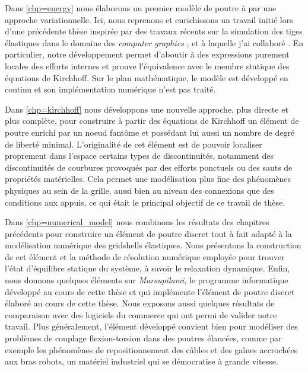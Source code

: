 Dans \cref{chp=energy} nous élaborons un premier modèle de poutre à  par une approche variationnelle. Ici, nous reprenons et enrichissons un travail initié lors d'une précédente thèse \cite{Tayeb2015} inspirée par des travaux récents sur la simulation des tiges élastiques dans le domaine des \emph{computer graphics} \cite{Bergou2008}, et à laquelle j'ai collaboré \cite{DuPeloux2015,Lefevre2017}. En particulier, notre développement permet d'aboutir à des expressions purement locales des efforts internes et prouve l'équivalence avec le membre statique des équations de Kirchhoff. Sur le plan mathématique, le modèle est développé en continu et son implémentation numérique n'est pas traité.

Dans \cref{chp=kirchhoff} nous développons une nouvelle approche, plus directe et plus complète, pour construire à partir des équations de Kirchhoff un élément de poutre  enrichi par un noeud fantôme et possédant lui aussi un nombre de degré de liberté minimal. L'originalité de cet élément est de pouvoir localiser proprement dans l'espace certains types de discontinuités, notamment des discontinuités de courbures provoqués par des efforts ponctuels ou des sauts de propriétés matérielles. Cela permet une modélisation plus fine des phénomènes physiques au sein de la grille, aussi bien au niveau des connexions que des conditions aux appuis, ce qui était le principal objectif de ce travail de thèse.

Dans \cref{chp=numerical_model} nous combinons les résultats des chapitres précédents pour construire un élément de poutre discret tout à fait adapté à la modélisation numérique des gridshells élastiques. Nous présentons la construction de cet élément et la méthode de résolution numérique employée pour trouver l'état d'équilibre statique du système, à savoir le relaxation dynamique. Enfin, nous donnons quelques éléments sur \emph{Marsupilami}, le programme informatique développé au cours de cette thèse et qui implémente l'élément de poutre discret élaboré au cours de cette thèse. Nous exposons aussi quelques résultats de comparaison avec des logiciels du commerce qui ont permi de valider notre travail. Plus généralement, l'élément développé convient bien pour modéliser des problèmes de couplage flexion-torsion dans des poutres élancées, comme par exemple les phénomènes de repositionnement des câbles et des gaînes accrochées aux bras robots, un matériel industriel qui se démocratise à grande vitesse.

